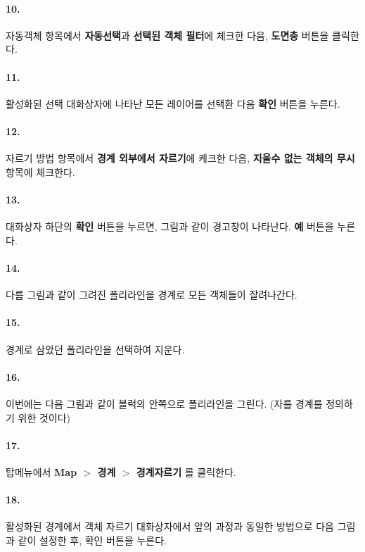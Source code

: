 \documentclass[12pt,a4paper,oneside]{book}
\begin{document}
	\paragraph {10.} 
	자동객체 항목에서 \textbf{자동선택}과 \textbf{선택된 객체 필터}에 체크한 다음, 
	\textbf{도면층} 버튼을 클릭한다.
	
	\paragraph {11.} 
	활성화된 선택 대화상자에 나타난 모든 레이어를 선택환 다음 \textbf{확인} 버튼을 누른다.
	
	\paragraph {12.} 
	자르기 방법 항목에서 \textbf{경계 외부에서 자르기}에 케크한 다음, 
	\textbf{지울수 없는 객체의 무시} 항목에 체크한다.
	
	\paragraph {13.} 
	대화상자 하단의 \textbf{확인} 버튼을 누르면, 그림과 같이 경고창이 나타난다. 
	\textbf{예} 버튼을 누른다.
	
	\paragraph {14.} 
	다름 그림과 같이 그려진 폴리라인을 경계로 모든 객체들이 잘려나간다.
	
	\paragraph {15.} 
	경계로 삼았던 폴리라인을 선택하여 지운다.
	
	\paragraph {16.} 
	이번에는 다음 그림과 같이 블럭의 안쪽으로 폴리라인을 그린다. (자를 경계를 정의하기 위한 것이다)
	
	\paragraph {17.} 
	탑메뉴에서 \textbf{Map $>$ 경계 $>$ 경계자르기} 를 클릭한다.
	
	\paragraph {18.} 
	활성화된 경계에서 객체 자르기 대화상자에서 앞의 과정과 동일한 방법으로 다음 그림과 같이 설정한 후, 
	확인 버튼을 누른다.
\end{document}
